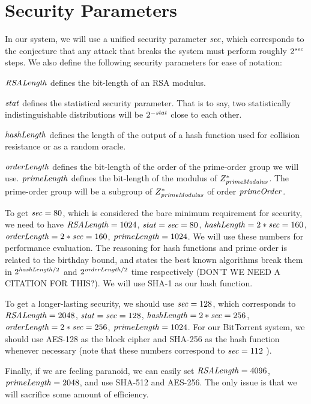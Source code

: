 \section{Security Parameters}\label{sec-params}
In our system, we will use a unified security parameter $ \mathit{sec} $, which corresponds to the conjecture that any attack that breaks the system must perform roughly $2^{\mathit{sec}}$ steps.  We also define the following security parameters for ease of notation:

$ \mathit{RSALength} $ defines the bit-length of an RSA modulus.

$ \mathit{stat} $ defines the statistical security parameter. That is to say, two statistically indistinguishable distributions will be $2^{-\mathit{stat}}$ close to each other.

$ \mathit{hashLength} $ defines the length of the output of a hash function used for collision resistance or as a random oracle.

$ \mathit{orderLength} $ defines the bit-length of the order of the prime-order group we will use. $ \mathit{primeLength} $ defines the bit-length of the modulus of $Z_{\mathit{primeModulus}}^*$. The prime-order group will be a subgroup of $Z_{\mathit{primeModulus}}^*$ of order $ \mathit{primeOrder} $.

To get $ \mathit{sec} = 80 $, which is considered the bare minimum requirement for security, we need to have $ \mathit{RSALength} = 1024 $, $ \mathit{stat} = \mathit{sec} = 80 $, $ \mathit{hashLength} = 2*\mathit{sec} = 160 $, $ \mathit{orderLength} = 2*\mathit{sec} = 160 $, $ \mathit{primeLength} = 1024 $. We will use these numbers for performance evaluation. The reasoning for hash functions and prime order is related to the birthday bound, and states the best known algorithms break them in $2^{\mathit{hashLength} / 2}$ and $2^{\mathit{orderLength} / 2}$ time respectively (DON'T WE NEED A CITATION FOR THIS?). We will use SHA-1 as our hash function.

To get a longer-lasting security, we should use $ \mathit{sec} = 128 $, which corresponds to $ \mathit{RSALength} = 2048 $, $ \mathit{stat} = \mathit{sec} = 128 $, $ \mathit{hashLength} = 2*\mathit{sec} = 256 $, $ \mathit{orderLength} = 2*\mathit{sec} = 256 $, $ \mathit{primeLength} = 1024 $. For our BitTorrent system, we should use AES-128 as the block cipher and SHA-256 as the hash function whenever necessary (note that these numbers correspond to $ \mathit{sec} = 112 $ \cite{RSAlabs1, RSAlabs2}).

Finally, if we are feeling paranoid, we can easily set $ \mathit{RSALength} = 4096 $, $ \mathit{primeLength} = 2048 $, and use SHA-512 and AES-256. The only issue is that we will sacrifice some amount of efficiency.
